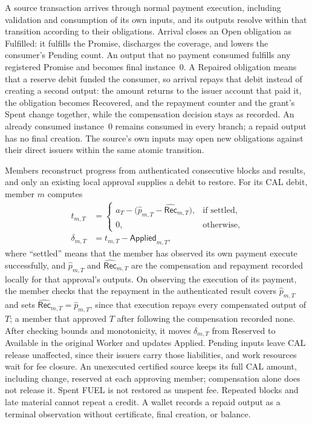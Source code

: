 A source transaction arrives through normal payment execution, including validation and consumption of its own inputs, and its outputs resolve within that transition according to their obligations. Arrival closes an Open obligation as Fulfilled: it fulfills the Promise, discharges the coverage, and lowers the consumer's Pending count. An output that no payment consumed fulfills any registered Promise and becomes final instance~0. A Repaired obligation means that a reserve debit funded the consumer, so arrival repays that debit instead of creating a second output: the amount returns to the issuer account that paid it, the obligation becomes Recovered, and the repayment counter and the grant's Spent change together, while the compensation decision stays as recorded. An already consumed instance~0 remains consumed in every branch; a repaid output has no final creation. The source's own inputs may open new obligations against their direct issuers within the same atomic transition.

Members reconstruct progress from authenticated consecutive blocks and results, and only an existing local approval supplies a debit to restore. For its CAL debit, member $m$ computes
\begin{equation}
  \begin{aligned}
    t_{m,T}&=
    \begin{cases}
      a_T-\bigl(\widehat{p}_{m,T}-\widehat{\mathsf{Rec}}_{m,T}\bigr),
        &\text{if settled},\\
      0,&\text{otherwise},
    \end{cases}\\
    \delta_{m,T}&=t_{m,T}-\mathsf{Applied}_{m,T},
  \end{aligned}
  \label{eq:protocol-release}
\end{equation}
where ``settled'' means that the member has observed its own payment execute successfully, and $\widehat{p}_{m,T}$ and $\widehat{\mathsf{Rec}}_{m,T}$ are the compensation and repayment recorded locally for that approval's outputs. On observing the execution of its payment, the member checks that the repayment in the authenticated result covers $\widehat{p}_{m,T}$ and sets $\widehat{\mathsf{Rec}}_{m,T}=\widehat{p}_{m,T}$, since that execution repays every compensated output of $T$; a member that approved $T$ after following the compensation recorded none. After checking bounds and monotonicity, it moves $\delta_{m,T}$ from Reserved to Available in the original Worker and updates Applied. Pending inputs leave CAL release unaffected, since their issuers carry those liabilities, and work resources wait for fee closure. An unexecuted certified source keeps its full CAL amount, including change, reserved at each approving member; compensation alone does not release it. Spent FUEL is not restored as unspent fee. Repeated blocks and late material cannot repeat a credit. A wallet records a repaid output as a terminal observation without certificate, final creation, or balance.

